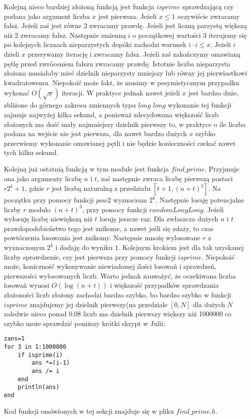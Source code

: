 \documentclass{article}
\begin{document}
Kolejną nieco bardziej złożoną funkcją jest funkcja $isprime$ sprawdzającą czy podana jako argument 
liczba $x$ jest pierwsza. Jeżeli $x \leq 1$ oczywiście zwracamy fałsz. Jeżeli zaś jest równe $2$ zwracamy
prawdę. Jeżeli jest liczną parzystą większą niż $2$ zwracamy fałsz. Następnie zmienną $i$ o początkowej wartości $3$ 
iterujemy się po kolejnych licznach nieparzystych dopóki zachodzi warunek $i \cdot i \leq x$.
Jeżeli $i$ dzieli $x$ przerywamy iterację i zwracamy fałsz. Jeżeli zaś zakończymy omawianą pętlę przed zwróceniem fałszu
zwracamy prawdę. Istotnie liczba nieparzysta złożona musiałaby mieć dzielnik nieparzysty mniejszy lub równy jej
pierwiastkowi kwadratowemu. Niepokoić może fakt, że musimy w pesymistycznym przypadku wykonać $O(\sqrt{x})$ iteracji.
W praktyce jednak nawet jeżeli $x$ jest bardzo duże, zbliżone do górnego zakresu zmiennych typu $long$ $long$ 
wykonanie tej funkcji zajmuje najwyżej kilka sekund, a ponieważ zdecydowana większość liczb złożonych ma 
dość mały najmniejszy dzielnik pierwszy to, w praktyce o ile liczba podana na wejście nie jest pierwsza, dla nawet bardzo dużych $x$ szybko przerwiemy wykonanie omawianej pętli i nie będzie konieczności czekać nawet tych kilku sekund.

Kolejną już ostatnią funkcją w tym module jest funkcja $find\_prime$. Przyjmuje ona jako argumenty liczbę $n$ i $t$, zaś następnie zwraca liczbę pierwszą postaci $r2^k+1$, gdzie $r$ jest liczbą naturalną z przedziału $[t+1,(n+t)^3]$. Na początku przy pomocy funkcji $pow2$ wyznaczam $2^k$. Następnie losuję potencjalne liczby $r$ modulo $(n+t)^3$, przy pomocy
funkcji $randomLongLong$. Jeżeli wylosuję liczbę niewiększą niż $t$ losuję jeszcze raz. Dla zwłaszcza dużych $n$ i $t$
prawdopodobieństwo tego jest znikome, a nawet jeśli się zdaży, to czas powtórzenia losowania jest znikomy. Następnie mnożę
wylosowane $r$ z wyznaczonym $2^k$ i dodaję do wyniku $1$. Kolejnym krokiem jest dla tak uzyskanej liczby sprawdzenie, czy 
jest pierwsza przy pomocy funkcji $isprime$. Niepokoić może, koniczność wykonywanie niewiadomej ilości losowań i sprawdzeń, pierwszości wylosowanych liczb. Warto jednak zauważyć, że oczekiwana liczba losowań wynosi $O(\log(n+t))$ i większość przypadków sprawdzania złożoności liczb złożony zachodzi bardzo szybko, bo bardzo szybko w funkcji $isprime$ znajdujemy jej dzielnik pierwszy(na przedziale $[0,N]$ dla dużych $N$ zaledwie nieco ponad $0.08$ liczb ma dzielnik pierwszy większy niż 1000000 co szybko może sprawdzić poniższy krótki skrypt w Julii:
\begin{lstlisting}
zans=1
for 3 in 1:1000000
    if isprime(i)
        ans *=(i-1)
        ans /= i
    end 
    println(ans)
end
\end{lstlisting}
Kod funkcji omówionych w tej sekcji znajduje się w pliku $find\_prime.h$.
\end{document}
